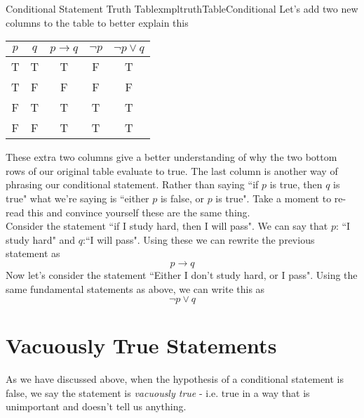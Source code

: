 \begin{exmpl}[label={exmpl:truthTableConditional}]{Conditional Statement Truth Table}{xmpltruthTableConditional}
    Let's add two new columns to the table to better explain this

    \begin{center}
        \begin{tabular}{|c|c|c|c|c|}
            \hline
            $p$ & $q$ & $p \to q$ & $\lnot p$ & $\lnot p \lor q$ \\
            \hline
            T   & T   & T         & F         & T                \\
            \hline
            T   & F   & F         & F         & F                \\
            \hline
            F   & T   & T         & T         & T                \\
            \hline
            F   & F   & T         & T         & T                \\
            \hline
        \end{tabular}
    \end{center}

    These extra two columns give a better understanding of why the two bottom rows of our original table evaluate to true. The last column is another way of phrasing our conditional statement. Rather than saying ``if $p$ is true, then $q$ is true" what we're saying is ``either $p$ is false, or $p$ is true". Take a moment to re-read this and convince yourself these are the same thing.\\

    Consider the statement ``if I study hard, then I will pass". We can say that $p$: ``I study hard" and $q$:``I will pass". Using these we can rewrite the previous statement as
    $$p \to q$$
    Now let's consider the statement ``Either I don't study hard, or I pass". Using the same fundamental statements as above, we can write this as
    $$\lnot p \lor q$$
\end{exmpl}

\newpage

\section{Vacuously True Statements}
As we have discussed above, when the hypothesis of a conditional statement is false, we say the statement is \emph{vacuously true} - i.e. true in a way that is unimportant and doesn't tell us anything.\\

